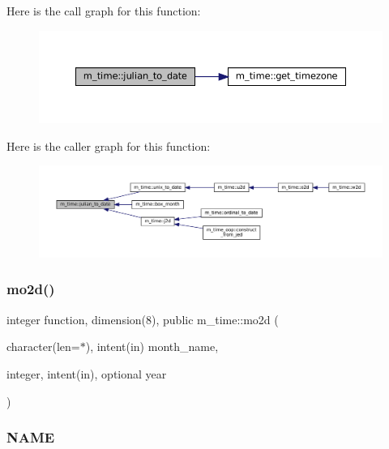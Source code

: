 Here is the call graph for this function\+:\nopagebreak
\begin{figure}[H]
\begin{center}
\leavevmode
\includegraphics[width=350pt]{namespacem__time_abb44cf18cd0a3e420c20469efb056203_cgraph}
\end{center}
\end{figure}
Here is the caller graph for this function\+:
\nopagebreak
\begin{figure}[H]
\begin{center}
\leavevmode
\includegraphics[width=350pt]{namespacem__time_abb44cf18cd0a3e420c20469efb056203_icgraph}
\end{center}
\end{figure}
\mbox{\label{namespacem__time_a8188c7ed4e592c4f2388d28c75486726}} 
\subsubsection{\texorpdfstring{mo2d()}{mo2d()}}
{\footnotesize\ttfamily integer function, dimension(8), public m\+\_\+time\+::mo2d (\begin{DoxyParamCaption}\item[{character(len=$\ast$), intent(in)}]{month\+\_\+name,  }\item[{integer, intent(in), optional}]{year }\end{DoxyParamCaption})}



\subsubsection*{N\+A\+ME}


